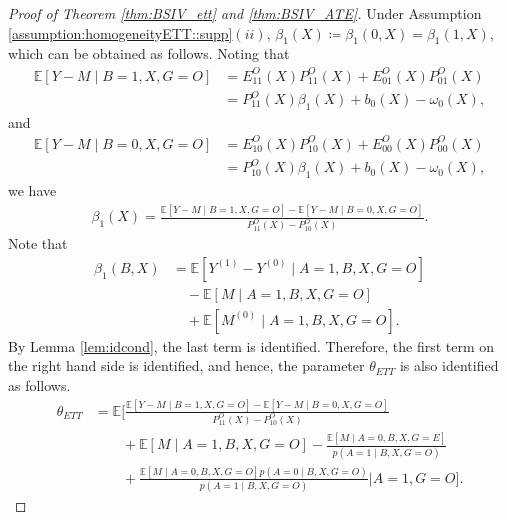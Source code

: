 \documentclass[10pt]{article}
\newcommand{\E}{\mathbb{E}}
\begin{document}
\begin{proof}[Proof of Theorem \ref{thm:BSIV_ett} and \ref{thm:BSIV_ATE}]
Under Assumption \ref{assumption:homogeneityETT::supp}$(ii)$, $\beta_1(X)\coloneqq\beta_1(0,X)=\beta_1(1,X)$, which can be obtained as follows. Noting that
\begin{align*}
\E[Y-M\mid B=1,X,G=O]
&=E_{11}^O(X)P_{11}^O(X)+E_{01}^O(X)P_{01}^O(X)\\
&=P_{11}^O(X)\beta_1(X)+b_0(X)-\omega_0(X),
\end{align*}
and
\begin{align*}
\E[Y-M\mid B=0,X,G=O]
&=E_{10}^O(X)P_{10}^O(X)+E_{00}^O(X)P_{00}^O(X)\\
&=P_{10}^O(X)\beta_1(X)+b_0(X)-\omega_0(X),
\end{align*}
we have
\begin{align*}
\beta_1(X)=\frac{\E[Y-M\mid B=1,X,G=O]-\E[Y-M\mid B=0,X,G=O]}{P_{11}^O(X)-P_{10}^O(X)}.
\end{align*}
Note that
\begin{align*}
\beta_1(B,X)
&=\E[Y^{(1)}-Y^{(0)}\mid A=1,B,X,G=O]\\
&\quad-\E[M\mid A=1,B,X,G=O]\\
&\quad+\E[M^{(0)}\mid A=1,B,X,G=O].
\end{align*}	
By Lemma \ref{lem:idcond}, the last term is identified. Therefore, the first term on the right hand side is identified, and hence, the parameter $\theta_{ETT}$ is also identified as follows.
\begin{align*}
\theta_{ETT}
&=\E\Big[
\frac{\E[Y-M\mid B=1,X,G=O]-\E[Y-M\mid B=0,X,G=O]}{P_{11}^O(X)-P_{10}^O(X)}\\
&\qquad+\E[M\mid A=1,B,X,G=O]-\frac{\E[M\mid A=0,B,X,G=E]}{p(A=1\mid B,X,G=O)}\\
&\qquad+\frac{\E[M\mid A=0,B,X,G=O]p(A=0\mid B,X,G=O)}{p(A=1\mid B,X,G=O)}\Big|A=1, G=O\Big].
\end{align*}
	

\end{proof}
\end{document}
